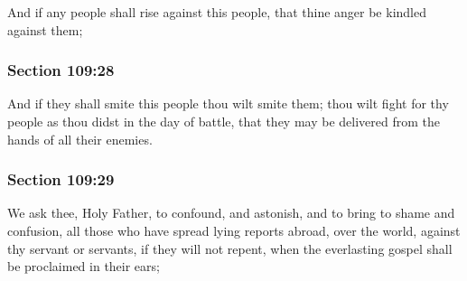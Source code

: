 		And if any people shall rise against this people, that thine anger be kindled against them;


	\subsubsection{Section 109:28} %
		\label{DC109-28}

		And if they shall smite this people thou wilt smite them; thou wilt fight for thy people as thou didst in the day of battle, that they may be delivered from the hands of all their enemies.


	\subsubsection{Section 109:29} %
		\label{DC109-29}

		We ask thee, Holy Father, to confound, and astonish, and to bring to shame and confusion, all those who have spread lying reports abroad, over the world, against thy servant or servants, if they will not repent, when the everlasting gospel shall be proclaimed in their ears;


